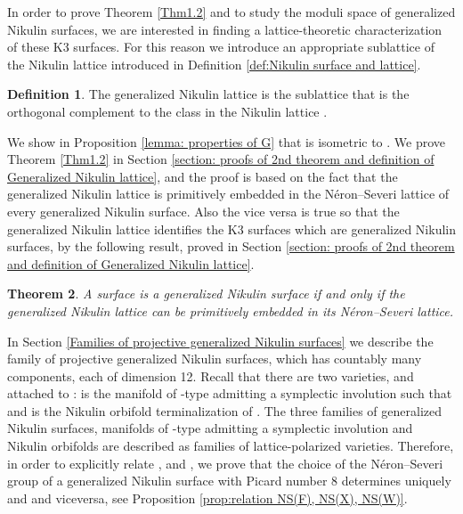 \documentclass{amsart}
\makeatletter
\newtheorem{thm}{Theorem}[section]
\theoremstyle{definition}
\newtheorem{defi}[thm]{Definition}
\numberwithin{equation}{section}
\numberwithin{equation}{section} \theoremstyle{definition}
\DeclareMathOperator{\NS}{NS}
\DeclareMathOperator{\T}{T}
\DeclareMathOperator{\Fix}{Fix}
\newcounter{mathrecordid}
\newcommand{\mathboxbegin}[1]{%
  \stepcounter{mathrecordid}%
  \immediate\write\mathrecords{\themathrecordid,#1}%
  \special{pdf:bann << /Type /Annot /Subtype /Link /Border [0 0 0]
    /MathBoxID \themathrecordid /F 2
    /A << /S /URI /URI (urn:mathbox:\themathrecordid) >> >>}}
\newcommand{\mathboxinlineplain}[1]{$#1$}
\newcommand{\mathboxinline}[1]{%
  $\mathboxbegin{inline}%
  \special{pdf:literal direct /MathBoxBegin\themathrecordid\space MP}%
  #1\special{pdf:literal direct /MathBoxEnd\themathrecordid\space MP}%
  \special{pdf:eann}$}
\newcommand{\recordmath}{%
  \ifmeasuring@\expandafter\mathboxinlineplain
  \else\expandafter\mathboxinline\fi}
\makeatother
\begin{document}
In order to prove Theorem \ref{Thm1.2} and to study the moduli space of generalized Nikulin surfaces,  we are interested in finding a lattice-theoretic characterization of these K3 surfaces. For this reason we introduce an appropriate sublattice of the Nikulin lattice introduced in Definition \ref{def:Nikulin surface and lattice}.

\begin{defi}\label{defi: generalizad Nikulin orbifold}
The generalized 
Nikulin lattice is the sublattice \recordmath{G\subset N} that is the orthogonal complement to the class \recordmath{\frac{1}{2}(\sum_i E_i)} in the Nikulin lattice \recordmath{N}.\end{defi}

We show in Proposition \ref{lemma: properties of G} that \recordmath{G} is isometric to \recordmath{E_7(-2)}.
We  prove Theorem \ref{Thm1.2} in Section \ref{section: proofs of 2nd theorem and definition of Generalized Nikulin lattice}, and the proof is  based on the fact that the generalized Nikulin lattice is primitively embedded in the N\'eron--Severi lattice of every generalized Nikulin surface. Also the vice versa is true so that the generalized Nikulin lattice identifies the K3 surfaces which are generalized Nikulin surfaces, by the following result, proved in Section \ref{section: proofs of 2nd theorem and definition of Generalized Nikulin lattice}.

\begin{thm}\label{thm: projective $K3$ G polarized are generalized Nikulin}
A \recordmath{K3} surface is a generalized Nikulin surface if and only if the generalized Nikulin lattice can be primitively embedded in its N\'eron--Severi lattice.
\end{thm}

In Section \ref{Families of projective generalized Nikulin surfaces} we  describe the family of projective generalized Nikulin surfaces, which has countably many components, each of dimension 12. Recall that there are two varieties, \recordmath{X} and \recordmath{Y} attached to \recordmath{F}: \recordmath{X} is the  manifold of \recordmath{K3^{[2]}}-type admitting a symplectic involution \recordmath{\iota} such that \recordmath{\Fix_{\iota}(X)\supset F} and \recordmath{Y} is the Nikulin orbifold terminalization of \recordmath{X/\iota}. The three families of generalized Nikulin surfaces,  manifolds of \recordmath{K3^{[2]}}-type admitting a symplectic involution and  Nikulin orbifolds are described as families of lattice-polarized varieties. Therefore, in order to explicitly relate \recordmath{F}, \recordmath{X} and \recordmath{Y}, we prove that the choice of the N\'eron--Severi group of a generalized Nikulin surface \recordmath{F} with Picard number 8 determines uniquely \recordmath{(\NS(X), \T_X)} and \recordmath{(\NS(Y), \T_Y)} and viceversa, see Proposition \ref{prop:relation NS(F), NS(X), NS(W)}.
\end{document}
